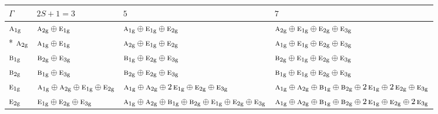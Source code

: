 \documentclass[10pt,a4paper]{article}
\numberwithin{equation}{section}
\newcommand{\irr}[1]{\text{\normalfont\scshape #1}}
\newcommand{\ptag}[1]{\mathrm{#1}}
\begin{document}
{\small\setlength{\tabcolsep}{3pt}\begin{longtable}{@{}l>{\RaggedRight\arraybackslash}p{}>{\RaggedRight\arraybackslash}p{}>{\RaggedRight\arraybackslash}p{}@{}}\toprule
$\Gamma$ & $2S + 1 = 3$ & $5$ & $7$\\\midrule\endhead
\bottomrule\endfoot\endlastfoot
$\irr{a}_{1\ptag{g}}$ & $\irr{a}_{2\ptag{g}}\oplus \irr{e}_{1\ptag{g}}$ & $\irr{a}_{1\ptag{g}}\oplus \irr{e}_{1\ptag{g}}\oplus \irr{e}_{2\ptag{g}}$ & $\irr{a}_{2\ptag{g}}\oplus \irr{e}_{1\ptag{g}}\oplus \irr{e}_{2\ptag{g}}\oplus \irr{e}_{3\ptag{g}}$\\*
$\irr{a}_{2\ptag{g}}$ & $\irr{a}_{1\ptag{g}}\oplus \irr{e}_{1\ptag{g}}$ & $\irr{a}_{2\ptag{g}}\oplus \irr{e}_{1\ptag{g}}\oplus \irr{e}_{2\ptag{g}}$ & $\irr{a}_{1\ptag{g}}\oplus \irr{e}_{1\ptag{g}}\oplus \irr{e}_{2\ptag{g}}\oplus \irr{e}_{3\ptag{g}}$\\
$\irr{b}_{1\ptag{g}}$ & $\irr{b}_{2\ptag{g}}\oplus \irr{e}_{3\ptag{g}}$ & $\irr{b}_{1\ptag{g}}\oplus \irr{e}_{2\ptag{g}}\oplus \irr{e}_{3\ptag{g}}$ & $\irr{b}_{2\ptag{g}}\oplus \irr{e}_{1\ptag{g}}\oplus \irr{e}_{2\ptag{g}}\oplus \irr{e}_{3\ptag{g}}$\\
$\irr{b}_{2\ptag{g}}$ & $\irr{b}_{1\ptag{g}}\oplus \irr{e}_{3\ptag{g}}$ & $\irr{b}_{2\ptag{g}}\oplus \irr{e}_{2\ptag{g}}\oplus \irr{e}_{3\ptag{g}}$ & $\irr{b}_{1\ptag{g}}\oplus \irr{e}_{1\ptag{g}}\oplus \irr{e}_{2\ptag{g}}\oplus \irr{e}_{3\ptag{g}}$\\
$\irr{e}_{1\ptag{g}}$ & $\irr{a}_{1\ptag{g}}\oplus \irr{a}_{2\ptag{g}}\oplus \irr{e}_{1\ptag{g}}\oplus \irr{e}_{2\ptag{g}}$ & $\irr{a}_{1\ptag{g}}\oplus \irr{a}_{2\ptag{g}}\oplus 2\,\irr{e}_{1\ptag{g}}\oplus \irr{e}_{2\ptag{g}}\oplus \irr{e}_{3\ptag{g}}$ & $\irr{a}_{1\ptag{g}}\oplus \irr{a}_{2\ptag{g}}\oplus \irr{b}_{1\ptag{g}}\oplus \irr{b}_{2\ptag{g}}\oplus 2\,\irr{e}_{1\ptag{g}}\oplus 2\,\irr{e}_{2\ptag{g}}\oplus \irr{e}_{3\ptag{g}}$\\
$\irr{e}_{2\ptag{g}}$ & $\irr{e}_{1\ptag{g}}\oplus \irr{e}_{2\ptag{g}}\oplus \irr{e}_{3\ptag{g}}$ & $\irr{a}_{1\ptag{g}}\oplus \irr{a}_{2\ptag{g}}\oplus \irr{b}_{1\ptag{g}}\oplus \irr{b}_{2\ptag{g}}\oplus \irr{e}_{1\ptag{g}}\oplus \irr{e}_{2\ptag{g}}\oplus \irr{e}_{3\ptag{g}}$ & $\irr{a}_{1\ptag{g}}\oplus \irr{a}_{2\ptag{g}}\oplus \irr{b}_{1\ptag{g}}\oplus \irr{b}_{2\ptag{g}}\oplus 2\,\irr{e}_{1\ptag{g}}\oplus \irr{e}_{2\ptag{g}}\oplus 2\,\irr{e}_{3\ptag{g}}$\\

\end{longtable}}
\end{document}
